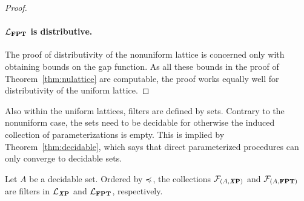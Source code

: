 \begin{proof}
  \paragraph{$\mathcal{L}_{\textnormal{\textbf{FPT}}}$ is distributive.}
  The proof of distributivity of the nonuniform lattice is concerned only with obtaining bounds on the gap function.
  As all these bounds in the proof of Theorem~\ref{thm:nulattice} are computable, the proof works equally well for distributivity of the uniform lattice.
\end{proof}

Also within the uniform lattices, filters are defined by sets.
Contrary to the nonuniform case, the sets need to be decidable for otherwise the induced collection of parameterizations is empty.
This is implied by Theorem~\ref{thm:decidable}, which says that direct parameterized procedures can only converge to decidable sets.
\begin{theorem}
\label{thm:filter}
  Let $A$ be a decidable set.
  Ordered by $\preccurlyeq$, the collections $\mathcal{F}_{(A, \textnormal{\textbf{\textit{X}P}})}$ and $\mathcal{F}_{(A, \textnormal{\textbf{FPT}})}$ are filters in $\mathcal{L}_{\textnormal{\textbf{\textit{X}P}}}$ and $\mathcal{L}_{\textnormal{\textbf{FPT}}}$, respectively.
\end{theorem}
